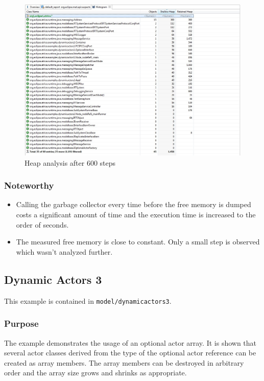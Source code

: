 \begin{figure}
\includegraphics[scale=0.45]{images/039-DynAct2-HeapAnalysis.jpg}
\caption{Heap analysis after 600 steps}
\label{fig:dynact2_heap}
\end{figure}

\subsubsection{Noteworthy}

\begin{itemize}
\item Calling the garbage collector every time before the free memory is dumped
costs a significant amount of time and the execution time is increased to the order of seconds.
\item The measured free memory is close to constant. Only a small step is observed which wasn't analyzed further.
\end{itemize}

\subsection{Dynamic Actors 3}

This example is contained in \texttt{model/dynamicactors3}.

\subsubsection{Purpose}

The example demonstrates the usage of an optional actor array. It is shown that several actor classes
derived from the type of the optional actor reference can be created as array members.
The array members can be destroyed in arbitrary order and the array size grows and shrinks as appropriate.

